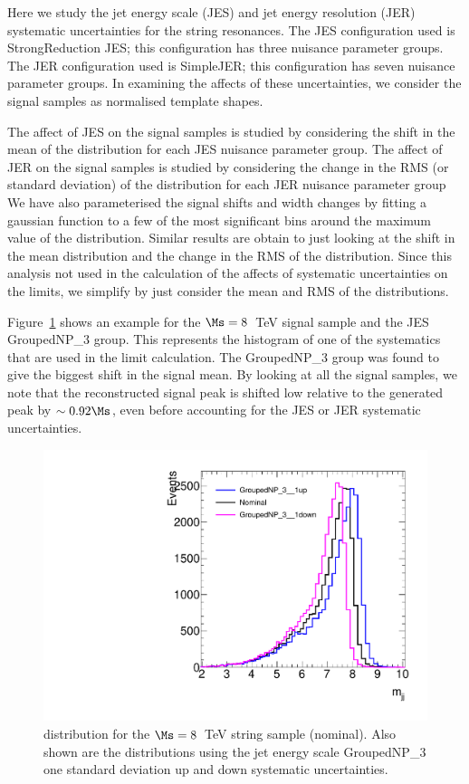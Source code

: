 Here we study the jet energy scale (JES) and jet energy resolution (JER)
systematic uncertainties for the string resonances. 
The JES configuration used is StrongReduction JES; this configuration
has three nuisance parameter groups.
The JER configuration used is SimpleJER; this configuration has seven
nuisance parameter groups.
In examining the affects of these uncertainties, we consider the signal
samples as normalised template shapes. 

The affect of JES on the signal samples is studied by considering the
shift in the mean of the distribution for each JES nuisance parameter
group.
The affect of JER on the signal samples is studied by considering the
change in the RMS (or standard deviation) of the distribution for each
JER nuisance parameter group
We have also parameterised the signal shifts and width changes by
fitting a gaussian function to a few of the most significant bins around
the maximum value of the distribution. 
Similar results are obtain to just looking at the shift in the mean
distribution and the change in the RMS of the distribution.
Since this analysis not used in the calculation of the affects of
systematic uncertainties on the limits, we simplify by just
consider the mean and RMS of the distributions. 

Figure~\ref{fig2} shows an example for the $\Ms = 8$~TeV signal sample
and the JES GroupedNP\_3 group.
This represents the histogram of one of the systematics that are used in
the limit calculation.
The GroupedNP\_3 group was found to give the biggest shift in the signal
mean.
By looking at all the signal samples, we note that the reconstructed
signal peak is shifted low relative to the generated peak by $\sim
0.92\Ms$, even before accounting for the JES or JER systematic
uncertainties. 

\begin{figure}[htb]
\begin{center}
\includegraphics[width=0.7\linewidth]{figures/strings/JES_shift}
\end{center}
\caption{\mjj distribution for the $\Ms = 8$~TeV string sample (nominal).
Also shown are the distributions using the jet energy scale
GroupedNP\_3 one standard deviation up and down systematic uncertainties.}
\label{fig2}
\end{figure}


